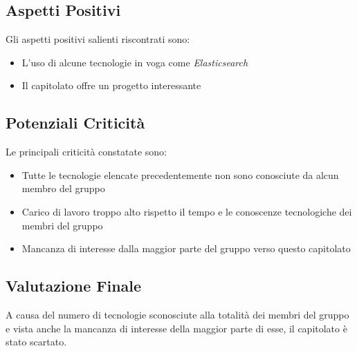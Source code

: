 \subsection{Aspetti Positivi}
Gli aspetti positivi salienti riscontrati sono:
\begin{itemize}
	\item L'uso di alcune tecnologie in voga come \textit{Elasticsearch}
	\item Il capitolato offre un progetto interessante
\end{itemize}

\subsection{Potenziali Criticità}
Le principali criticità constatate sono:
\begin{itemize}
	\item Tutte le tecnologie elencate precedentemente non sono conosciute da alcun membro del gruppo
	\item Carico di lavoro troppo alto rispetto il tempo e le conoscenze tecnologiche dei membri del gruppo
	\item Mancanza di interesse dalla maggior parte del gruppo verso questo capitolato
\end{itemize}

\subsection{Valutazione Finale}
A causa del numero di tecnologie sconosciute alla totalità dei membri del gruppo e vista anche la mancanza di interesse della maggior parte di esse, il capitolato è stato scartato.
	